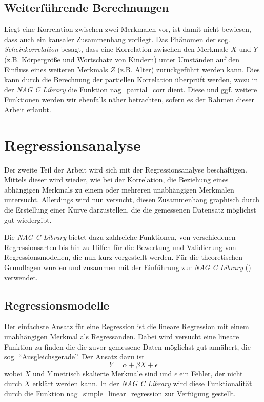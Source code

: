 \documentclass{article}
\begin{document}
\subsection{Weiterführende Berechnungen}

Liegt eine Korrelation zwischen zwei Merkmalen vor, ist damit nicht bewiesen, dass auch ein \underline{kausaler} Zusammenhang vorliegt. Das Phänomen der sog. {\it Scheinkorrelation} besagt, dass eine Korrelation zwischen den Merkmale $X$ und $Y$ (z.B. Körpergröße und Wortschatz von Kindern) unter Umständen auf den Einfluss eines weiteren Merkmals $Z$ (z.B. Alter) zurückgeführt werden kann. Dies kann durch die Berechnung der partiellen Korrelation überprüft werden, wozu in der {\it NAG C Library} die Funktion nag\_partial\_corr dient. Diese und ggf. weitere Funktionen werden wir ebenfalls näher betrachten, sofern es der Rahmen dieser Arbeit erlaubt.

\section{Regressionsanalyse}

Der zweite Teil der Arbeit wird sich mit der Regressionsanalyse beschäftigen.
Mittels dieser wird wieder, wie bei der Korrelation, die Beziehung eines abhängigen Merkmals zu einem oder mehreren unabhängigen Merkmalen untersucht.
Allerdings wird nun versucht, diesen Zusammenhang graphisch durch die Erstellung einer Kurve darzustellen, die die gemessenen Datensatz möglichst gut wiedergibt.

Die {\it NAG C Library} bietet dazu zahlreiche Funktionen, von verschiedenen Regressionsarten bis hin zu Hilfen für die Bewertung und Validierung von Regressionsmodellen, die nun kurz vorgestellt werden.
Für die theoretischen Grundlagen wurden \cite{Cramer2007} und \cite{Fahrmeier2010} zusammen mit der Einführung zur {\it NAG C Library} (\cite{nag:intro}) verwendet.

\subsection{Regressionsmodelle}

Der einfachste Ansatz für eine Regression ist die lineare Regression mit einem unabhängigen Merkmal als Regressanden.
Dabei wird versucht eine lineare Funktion zu finden die die zuvor gemessene Daten möglichst gut annähert, die sog. "`Ausgleichsgerade"'.
Der Ansatz dazu ist
\begin{equation*}
 Y = \alpha + \beta X +\epsilon
\end{equation*}
wobei $X$ und $Y$ metrisch skalierte Merkmale sind und $\epsilon$ ein Fehler, der nicht durch $X$ erklärt werden kann.
In der {\it NAG C Library} wird diese Funktionalität durch die Funktion nag\_simple\_linear\_regression zur Verfügung gestellt.
\end{document}
